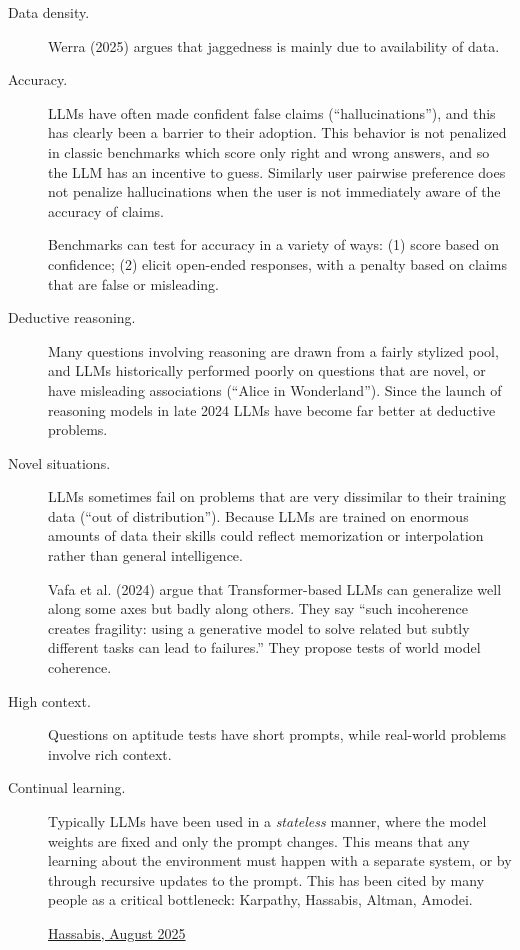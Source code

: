 \documentclass[
  letterpaper,
  DIV=11,
  numbers=noendperiod,
  oneside]{scrartcl}
\begin{document}
\begin{description}
\item[Data density.]
Werra (2025) argues that jaggedness is mainly due to availability of
data.
\item[Accuracy.]
LLMs have often made confident false claims (``hallucinations''), and
this has clearly been a barrier to their adoption. This behavior is not
penalized in classic benchmarks which score only right and wrong
answers, and so the LLM has an incentive to guess. Similarly user
pairwise preference does not penalize hallucinations when the user is
not immediately aware of the accuracy of claims.

Benchmarks can test for accuracy in a variety of ways: (1) score based
on confidence; (2) elicit open-ended responses, with a penalty based on
claims that are false or misleading.
\item[Deductive reasoning.]
Many questions involving reasoning are drawn from a fairly stylized
pool, and LLMs historically performed poorly on questions that are
novel, or have misleading associations (``Alice in Wonderland''). Since
the launch of reasoning models in late 2024 LLMs have become far better
at deductive problems.
\item[Novel situations.]
LLMs sometimes fail on problems that are very dissimilar to their
training data (``out of distribution''). Because LLMs are trained on
enormous amounts of data their skills could reflect memorization or
interpolation rather than general intelligence.

Vafa et al. (2024) argue that Transformer-based LLMs can generalize well
along some axes but badly along others. They say ``such incoherence
creates fragility: using a generative model to solve related but subtly
different tasks can lead to failures.'' They propose tests of world
model coherence.
\item[High context.]
Questions on aptitude tests have short prompts, while real-world
problems involve rich context.
\item[Continual learning.]
Typically LLMs have been used in a \emph{stateless} manner, where the
model weights are fixed and only the prompt changes. This means that any
learning about the environment must happen with a separate system, or by
through recursive updates to the prompt. This has been cited by many
people as a critical bottleneck: Karpathy, Hassabis, Altman, Amodei.

\href{https://aipositive.substack.com/p/decoding-deepminds-vision-an-analysis}{Hassabis,
August 2025}


\end{description}
\end{document}
